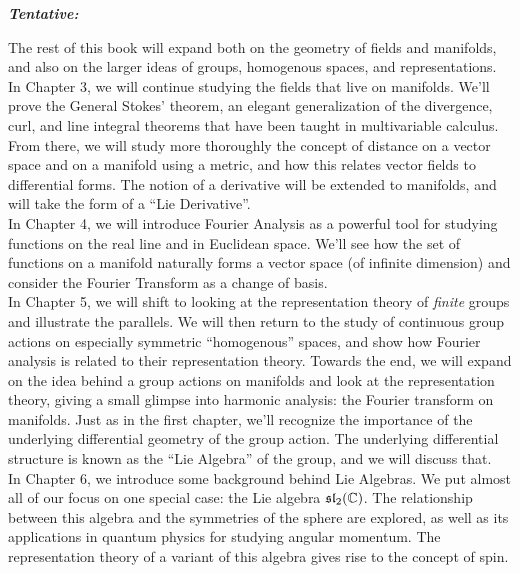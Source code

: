 	\begin{center}
		\textbf{\emph{{Tentative:}}}\\
	\end{center}
	The rest of this book will expand both on the geometry of fields and manifolds, and also on the larger ideas of groups, homogenous spaces, and representations. \\
	
	In Chapter 3, we will continue studying the fields that live on manifolds. We'll prove the General Stokes' theorem, an elegant generalization of the divergence, curl, and line integral theorems that have been taught in multivariable calculus. From there, we will study more thoroughly the concept of distance on a vector space and on a manifold using a metric, and how this relates vector fields to differential forms. The notion of a derivative will be extended to manifolds, and will take the form of a ``Lie Derivative''.\\
	
	In Chapter 4, we will introduce Fourier Analysis as a powerful tool for studying functions on the real line and in Euclidean space. We'll see how the set of functions on a manifold naturally forms a vector space (of infinite dimension) and consider the Fourier Transform as a change of basis. \\
	
	In Chapter 5, we will shift to looking at the representation theory of \emph{finite} groups and illustrate the parallels. We will then return to the study of continuous group actions on especially symmetric ``homogenous'' spaces, and show how Fourier analysis is related to their representation theory. Towards the end, we will expand on the idea behind a group actions on manifolds and look at the representation theory, giving a small glimpse into harmonic analysis: the Fourier transform on manifolds. Just as in the first chapter, we'll recognize the importance of the underlying differential geometry of the group action. The underlying differential structure is known as the ``Lie Algebra'' of the group, and we will discuss that.\\
	
	In Chapter 6, we introduce some background behind Lie Algebras. We put almost all of our focus on one special case: the Lie algebra $\frak{sl}_2 (\mathbb C)$. The relationship between this algebra and the symmetries of the sphere are explored, as well as its applications in quantum physics for studying angular momentum. The representation theory of a variant of this algebra gives rise to the concept of spin. \\
	

